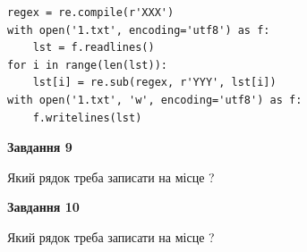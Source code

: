 \documentclass[12pt, ukrainian]{article}
\begin{document}
{\begin {large}
\begin{verbatim}
regex = re.compile(r'XXX')
with open('1.txt', encoding='utf8') as f:
    lst = f.readlines()
for i in range(len(lst)):
    lst[i] = re.sub(regex, r'YYY', lst[i])
with open('1.txt', 'w', encoding='utf8') as f:
    f.writelines(lst)
\end{verbatim}




{\begin {center}\textbf{Завдання 9}\end {center}}\par
Який рядок треба записати на місце  ?\par
\vspace{5mm}


{\begin {center}\textbf{Завдання 10}\end {center}}\par
Який рядок треба записати на місце  ?\par


\newpage


\end {large}}
\end{document}
